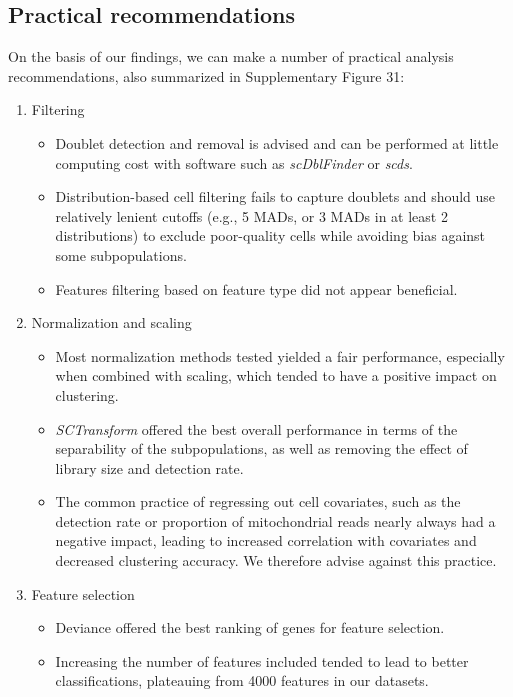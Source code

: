 \documentclass{bmcart}
\begin{document}
\subsection*{Practical recommendations}

On the basis of our findings, we can make a number of practical analysis recommendations, also summarized in Supplementary Figure 31:

\begin{enumerate}
   \item Filtering
   \begin{itemize}
     \item Doublet detection and removal is advised and can be performed at little computing cost with software such as \textit{scDblFinder} or \textit{scds}.
     \item Distribution-based cell filtering fails to capture doublets and should use relatively lenient cutoffs (e.g., 5 MADs, or 3 MADs in at least 2 distributions) to exclude poor-quality cells while avoiding bias against some subpopulations.
     \item Features filtering based on feature type did not appear beneficial.
   \end{itemize}
   \item Normalization and scaling
   \begin{itemize}
     \item Most normalization methods tested yielded a fair performance, especially when combined with scaling, which tended to have a positive impact on clustering.
     \item \textit{SCTransform} offered the best overall performance in terms of the separability of the subpopulations, as well as removing the effect of library size and detection rate.
     \item The common practice of regressing out cell covariates, such as the detection rate or proportion of mitochondrial reads nearly always had a negative impact, leading to increased correlation with covariates and decreased clustering accuracy. We therefore advise against this practice.
   \end{itemize}
   \item Feature selection
   \begin{itemize}
     \item Deviance \cite{townesGlmpca2019} offered the best ranking of genes for feature selection.
     \item Increasing the number of features included tended to lead to better classifications, plateauing from 4000 features in our datasets.

\end{itemize}
\end{enumerate}
\end{document}
